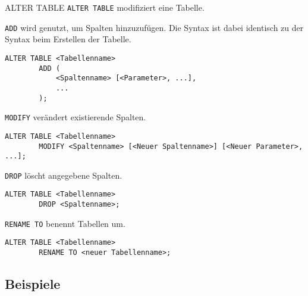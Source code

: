 \begin{sql}{ALTER TABLE}
    \texttt{ALTER TABLE} modifiziert eine Tabelle.

    \texttt{ADD} wird genutzt, um Spalten hinzuzufügen.
    Die Syntax ist dabei identisch zu der Syntax beim Erstellen der Tabelle.

    \begin{lstlisting}[language=mysql]
        ALTER TABLE <Tabellenname>
        ADD (
            <Spaltenname> [<Parameter>, ...],
            ...
        );
    \end{lstlisting}

    \texttt{MODIFY} verändert existierende Spalten.

    \begin{lstlisting}[language=mysql]
        ALTER TABLE <Tabellenname>
        MODIFY <Spaltenname> [<Neuer Spaltenname>] [<Neuer Parameter>, ...];
    \end{lstlisting}

    \texttt{DROP} löscht angegebene Spalten.

    \begin{lstlisting}[language=mysql]
        ALTER TABLE <Tabellenname>
        DROP <Spaltenname>;
    \end{lstlisting}

    \texttt{RENAME TO} benennt Tabellen um.

    \begin{lstlisting}[language=mysql]
        ALTER TABLE <Tabellenname>
        RENAME TO <neuer Tabellenname>;
    \end{lstlisting}
\end{sql}

\subsection{Beispiele}

